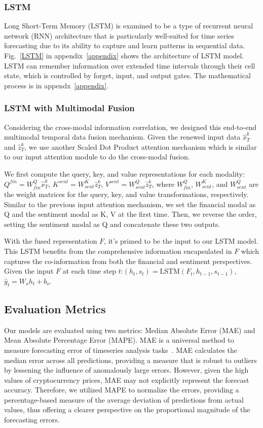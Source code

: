\subsubsection{LSTM}
Long Short-Term Memory (LSTM) is examined to be a type of recurrent neural network (RNN) architecture that is particularly well-suited for time series forecasting due to its ability to capture and learn patterns in sequential data. Fig.~\ref{LSTM} in appendix~\ref{appendix} shows the architecture of LSTM model. LSTM can remember information over extended time intervals through their cell state, which is controlled by forget, input, and output gates. The mathematical process is in appendx~\ref{appendix}.

\subsubsection{LSTM with Multimodal Fusion}
Considering the cross-modal information correlation, we designed this end-to-end multimodal temporal data fusion mechanism. Given the renewed input data $\hat{x}_T^k$ and $\hat{z}_T^k$, we use another Scaled Dot Product attention mechanism which is similar to our input attention module to do the cross-modal fusion. 

We first compute the query, key, and value representations for each modality:$Q^{fin} = {W^Q_{fin}}\hat{x}_T^k$, $K^{sent} = {W^K_{sent}}\hat{z}_T^k$, $V^{sent} = {W^Q_{sent}}\hat{z}_T^k$, where ${W^Q_{fin}}$, ${W^K_{sent}}$, and ${W^Q_{sent}}$ are the weight matrices for the query, key, and value transformations, respectively. Similar to the previous input attention mechanism, we set the financial modal as Q and the sentiment modal as K, V at the first time. Then, we reverse the order, setting the sentiment modal as Q and concatenate these two outputs. 

With the fused representation $F$, it's primed to be the input to our LSTM model. This LSTM benefits from the comprehensive information encapsulated in $F$ which captures the co-information from both the financial and sentiment perspectives. Given the input $F$ at each time step $t$:$(h_t, s_t) = \text{LSTM}(F_t, h_{t-1}, s_{t-1})$, $\hat{y}_t = W_o h_t + b_o$.






\subsection{Evaluation Metrics}
Our models are evaluated using two metrics: Median Absolute Error (MAE) and Mean Absolute Percentage Error (MAPE). MAE is a universal method to measure forecasting error of timeseries analysis tasks~\cite{hyndman2006another}. MAE calculates the median error across all predictions, providing a measure that is robust to outliers by lessening the influence of anomalously large errors. However, given the high values of cryptocurrency prices, MAE may not explicitly represent the forecast accuracy. Therefore, we utilized MAPE to normalize the errors, providing a percentage-based measure of the average deviation of predictions from actual values, thus offering a clearer perspective on the proportional magnitude of the forecasting errors.

